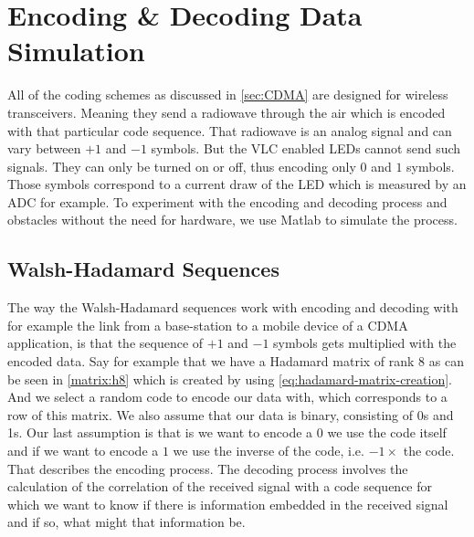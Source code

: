 
\section{Encoding \& Decoding Data Simulation}
\label{sec:enc-dec-theory}

	All of the coding schemes as discussed in \autoref{sec:CDMA} are designed for wireless transceivers.
	Meaning they send a radiowave through the air which is encoded with that particular code sequence.
	That radiowave is an analog signal and can vary between $+1$ and $-1$ symbols.
	But the VLC enabled LEDs cannot send such signals.
	They can only be turned on or off, thus encoding only $0$ and $1$ symbols.
	Those symbols correspond to a current draw of the LED which is measured by an ADC for example.
	To experiment with the encoding and decoding process and obstacles without the need for hardware, we use Matlab to simulate the process.

	\subsection{Walsh-Hadamard Sequences}

		The way the Walsh-Hadamard sequences work with encoding and decoding with for example the link from a base-station to a mobile device of a CDMA application, is that the sequence of $+1$ and $-1$ symbols gets multiplied with the encoded data. 
		Say for example that we have a Hadamard matrix of rank $8$ as can be seen in \autoref{matrix:h8} which is created by using \autoref{eq:hadamard-matrix-creation}.
		And we select a random code to encode our data with, which corresponds to a row of this matrix.
		We also assume that our data is binary, consisting of 0s and 1s. 
		Our last assumption is that is we want to encode a $0$ we use the code itself and if we want to encode a $1$ we use the inverse of the code, i.e. $-1 \times$ the code.
		That describes the encoding process. 
		The decoding process involves the calculation of the correlation of the received signal with a code sequence for which we want to know if there is information embedded in the received signal and if so, what might that information be.

